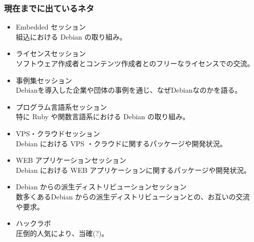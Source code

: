 \documentclass[mingoth,a4paper]{jsarticle}
\begin{document}
\subsubsection{現在までに出ているネタ}
\begin{itemize}
 \item Embedded セッション\\
       組込における Debian の取り組み。
 \item ライセンスセッション\\
       ソフトウェア作成者とコンテンツ作成者とのフリーなライセンスでの交流。
 \item 事例集セッション\\
       Debianを導入した企業や団体の事例を通じ、なぜDebianなのかを語る。
 \item プログラム言語系セッション\\
特に Ruby や関数言語系における Debian の取り組み。
 \item VPS・クラウドセッション\\
Debian における VPS ・クラウドに関するパッケージや開発状況。
 \item WEB アプリケーションセッション\\
Debian における WEB アプリケーションに関するパッケージや開発状況。
 \item Debian からの派生ディストリビューションセッション\\
数多くあるDebian からの派生ディストリビューションとの、お互いの交流や要求。
 \item ハックラボ\\
圧倒的人気により、当確(?)。
\end{itemize}




%
%
%
%
%
%
\end{document}

